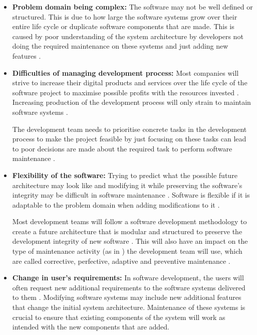 \begin{itemize}
	\item \textbf{Problem domain being complex:} The software may not be well defined or structured. This is due to how large the software systems grow over their entire life cycle or duplicate software components that are made. This is caused by poor understanding of the system architecture by developers not doing the required maintenance on these systems and just adding new features \cite{Galster2019, Booch1986}.
	\item \textbf{Difficulties of managing development process:} Most companies will strive to increase their digital products and services over the life cycle of the software project to maximise possible profits with the resources invested \cite{Niu2018}. Increasing production of the development process will only strain to maintain software systems \cite{Sneed2004}.\par The development team needs to prioritise concrete tasks in the development process to make the project feasible by just focusing on these tasks can lead to poor decisions are made about the required task to perform software maintenance \cite{Galster2019, Ogheneovo2014, Lenarduzzi2017}. 
	\item \textbf{Flexibility of the software:} Trying to predict what the possible future architecture may look like and modifying it while preserving the software's integrity may be difficult in software maintenance \cite{Garlan1999}. Software is flexible if it is adaptable to the problem domain when adding modifications to it \cite{Ogheneovo2014}.\par Most development teams will follow a software development methodology to create a future architecture that is modular and structured to preserve the development integrity of new software \cite{Vijayasarathy2016, Rehman2018}. This will also have an impact on the type of maintenance activity (as in ) the development team will use, which are called corrective, perfective, adaptive and preventive maintenance \cite{Thamburaj2017, Hasan2012, Stojanov2017, Snipes2018}.
	\item \textbf{Change in user's requirements:} In software development, the users will often request new additional requirements to the software systems delivered to them \cite{Ogheneovo2014}. Modifying software systems may include new additional features that change the initial system architecture. Maintenance of these systems is crucial to ensure that existing components of the system will work as intended with the new components that are added.
\end{itemize}

